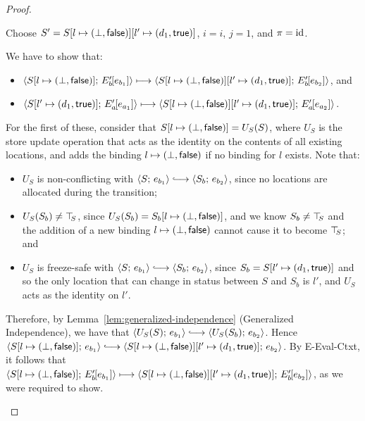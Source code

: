 \begin{proof}
\begin{enumerate}
\begin{enumerate}
      Choose $S' =
      S[l \mapsto (\bot, \textsf{false})][l' \mapsto (d_1, \textsf{true})]$,
      $i = i$, $j = 1$, and $\pi = \mathrm{id}$.

      We have to show that:
      \begin{itemize}
      \item
        $\langle S[l \mapsto (\bot, \textsf{false})];\, E'_b\hspace{-1mm}\left[e_{b_1}\right] \rangle
        \longmapsto
        \langle S[l \mapsto (\bot, \textsf{false})][l' \mapsto (d_1, \textsf{true})];\, E'_b\hspace{-1mm}\left[e_{b_2}\right] \rangle$,
        and
      \item
        $\langle S[l' \mapsto (d_1, \textsf{true})];\, E'_a\hspace{-1mm}\left[e_{a_1}\right] \rangle
        \longmapsto
        \langle S[l \mapsto (\bot, \textsf{false})][l' \mapsto (d_1, \textsf{true})];\, E'_a\hspace{-1mm}\left[e_{a_2}\right] \rangle$.
      \end{itemize}

      For the first of these, consider that
      $S[l \mapsto (\bot, \textsf{false})] = U_S(S)$, where $U_S$ is the
      store update operation that acts as the identity on the contents
      of all existing locations, and adds the binding
      $l \mapsto (\bot, \textsf{false})$ if no binding for $l$
      exists.  Note that:
      \begin{itemize}
        \item $U_S$ is non-conflicting with $\config{S}{e_{b_1}}
          \parstepsto \config{S_b}{e_{b_2}}$, since no locations are
          allocated during the transition;
        \item $U_S(S_b) \neq \top\hspace{-0.85mm}_{S}$, since $U_S(S_b) =
          S_b[l \mapsto (\bot, \textsf{false})]$, and we know $S_b \neq
          \top\hspace{-0.85mm}_{S}$ and the addition of a new binding
          $l \mapsto (\bot, \textsf{false})$ cannot cause it to
          become $\top\hspace{-0.85mm}_{S}$; and
        \item $U_S$ is freeze-safe with $\config{S}{e_{b_1}}
          \parstepsto \config{S_b}{e_{b_2}}$, since $S_b =
          S[l' \mapsto (d_1, \textsf{true})]$ and so the only location
          that can change in status between $S$ and $S_b$ is $l'$, and
          $U_S$ acts as the identity on $l'$.
      \end{itemize}
      Therefore, by Lemma~\ref{lem:generalized-independence}
      (Generalized Independence), we have that
      $\config{U_S(S)}{e_{b_1}} \parstepsto
      \config{U_S(S_b)}{e_{b_2}}$.  Hence
      $\config{\extS{S}{l}{\bot}{\frozenfalse}}{e_{b_1}} \parstepsto
      \config{\extS{\extS{S}{l}{\bot}{\frozenfalse}}{l'}{d_1}{\frozentrue}}{e_{b_2}}$.
      By {\sc E-Eval-Ctxt}, it follows that
      $\langle S[l \mapsto (\bot, \textsf{false})];\, E'_b\hspace{-1mm}\left[e_{b_1}\right] \rangle
      \longmapsto
      \langle S[l \mapsto (\bot, \textsf{false})][l' \mapsto (d_1, \textsf{true})];\, E'_b\hspace{-1mm}\left[e_{b_2}\right] \rangle$,
      as we were required to show.


\end{enumerate}
\end{enumerate}
\end{proof}
